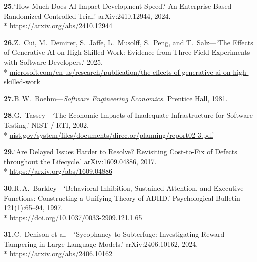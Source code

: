 \documentclass[11pt, a4paper]{article}
\begin{document}
\noindent\textbf{25.}\enspace `How Much Does AI Impact Development Speed? An
Enterprise-Based Randomized Controlled Trial.' arXiv:2410.12944, 2024.\\*
{\fontsize{8}{10}\selectfont\color{midb}
\href{https://arxiv.org/abs/2410.12944}{https://arxiv.org/abs/2410.12944}}


\noindent\textbf{26.}\enspace Z.~Cui, M.~Demirer, S.~Jaffe, L.~Musolff, S.~Peng, and
T.~Salz---`The Effects of Generative AI on High-Skilled Work: Evidence from Three Field
Experiments with Software Developers.' 2025.\\*
{\fontsize{8}{10}\selectfont\color{midb}
\href{https://www.microsoft.com/en-us/research/publication/the-effects-of-generative-ai-on-high-skilled-work-evidence-from-three-field-experiments-with-software-developers/}{microsoft.com/en-us/research/publication/the-effects-of-generative-ai-on-high-skilled-work}}


\noindent\textbf{27.}\enspace B.\,W.~Boehm---\emph{Software Engineering Economics.}
Prentice Hall, 1981.


\noindent\textbf{28.}\enspace G.~Tassey---`The Economic Impacts of Inadequate
Infrastructure for Software Testing.' NIST / RTI, 2002.\\*
{\fontsize{8}{10}\selectfont\color{midb}
\href{https://www.nist.gov/system/files/documents/director/planning/report02-3.pdf}{nist.gov/system/files/documents/director/planning/report02-3.pdf}}


\noindent\textbf{29.}\enspace `Are Delayed Issues Harder to Resolve? Revisiting Cost-to-Fix
of Defects throughout the Lifecycle.' arXiv:1609.04886, 2017.\\*
{\fontsize{8}{10}\selectfont\color{midb}
\href{https://arxiv.org/abs/1609.04886}{https://arxiv.org/abs/1609.04886}}


\noindent\textbf{30.}\enspace R.\,A.~Barkley---`Behavioral Inhibition, Sustained Attention,
and Executive Functions: Constructing a Unifying Theory of ADHD.' Psychological Bulletin
121(1):65--94, 1997.\\*
{\fontsize{8}{10}\selectfont\color{midb}
\href{https://doi.org/10.1037/0033-2909.121.1.65}{https://doi.org/10.1037/0033-2909.121.1.65}}


\noindent\textbf{31.}\enspace C.~Denison et al.---`Sycophancy to Subterfuge:
Investigating Reward-Tampering in Large Language Models.' arXiv:2406.10162, 2024.\\*
{\fontsize{8}{10}\selectfont\color{midb}
\href{https://arxiv.org/abs/2406.10162}{https://arxiv.org/abs/2406.10162}}
\end{document}

